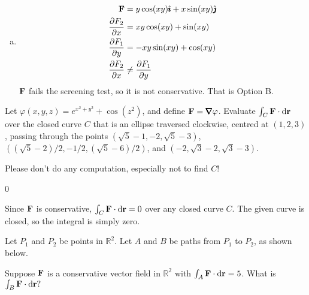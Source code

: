 \begin{solution}
\begin{enumerate}[a.]
\item
 \begin{align*}\mathbf{F}&=y\cos(xy)\hat{\pmb{\imath}} + x\sin(xy)\hat{\pmb{\jmath}} \\
\frac{\partial F_2}{\partial x}&=xy\cos(xy)+\sin(xy)\\
\frac{\partial F_1}{\partial y}&=-xy\sin(xy)+\cos(xy)\\
\frac{\partial F_2}{\partial x}&\neq \frac{\partial F_1}{\partial y}
\end{align*}
$\mathbf{F}$ fails the screening test, so it is not conservative.
That is Option B.

\end{enumerate}
\end{solution}

\begin{question}
Let $\varphi(x,y,z)=e^{x^2+y^2}+\cos(z^2)$, and define $\vF = \vnabla \varphi$. Evaluate $\int_C\mathbf{F}\cdot\mathrm{d}\mathbf{r}$ over the closed curve $C$ that is an ellipse  traversed clockwise, centred at $(1,2,3)$, passing through the points $(\sqrt5-1,-2,\sqrt5-3)$, $((\sqrt5-2)/2,-1/2,(\sqrt5-6)/2)$, and $(-2,\sqrt 3-2,\sqrt3-3)$.
\end{question}
\begin{hint}
Please don't do any computation, especially not to find $C$!
\end{hint}
\begin{answer}
0
\end{answer}
\begin{solution}
Since $\mathbf{F}$ is conservative, $\int_C\mathbf{F}\cdot\mathrm{d}\mathbf{r}=0$ over any closed curve $C$. The given curve is closed, so the integral is simply zero.
\end{solution}
\begin{question}
Let $P_1$ and $P_2$ be points in $\mathbb R^2$. Let $A$ and $B$ be paths from $P_1$ to $P_2$, as shown below.


\begin{center}
\end{center}

Suppose $\mathbf{F}$ is a conservative vector field in $\mathbb R^2$ with $\int_A \mathbf{F}\cdot\mathrm{d}\mathbf{r}=5$. What is $\int_B \mathbf{F}\cdot\mathrm{d}\mathbf{r}?$
\end{question}
